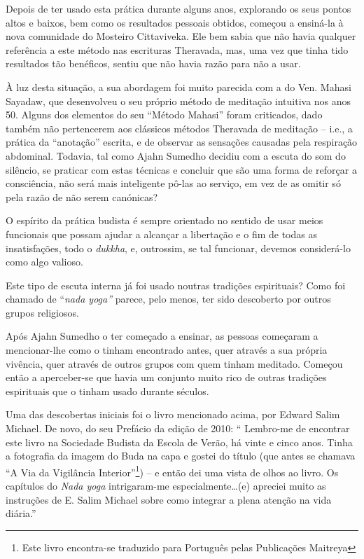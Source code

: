 Depois de ter usado esta prática durante alguns anos, explorando os seus
pontos altos e baixos, bem como os resultados pessoais obtidos, começou
a ensiná-la à nova comunidade do Mosteiro Cittaviveka. Ele bem sabia que
não havia qualquer referência a este método nas escrituras Theravada,
mas, uma vez que tinha tido resultados tão benéficos, sentiu que não
havia razão para não a usar.

À luz desta situação, a sua abordagem foi muito parecida com a do Ven.
Mahasi Sayadaw, que desenvolveu o seu próprio método de meditação
intuitiva nos anos 50. Alguns dos elementos do seu ``Método Mahasi''
foram criticados, dado também não pertencerem aos clássicos métodos
Theravada de meditação -- i.e., a prática da ``anotação'' escrita, e de
observar as sensações causadas pela respiração abdominal. Todavia, tal
como Ajahn Sumedho decidiu com a escuta do som do silêncio, se praticar
com estas técnicas e concluir que são uma forma de reforçar a
consciência, não será mais inteligente pô-las ao serviço, em vez de as
omitir só pela razão de não serem canónicas?

O espírito da prática budista é sempre orientado no sentido de usar
meios funcionais que possam ajudar a alcançar a libertação e o fim de
todas as insatisfações, todo o \emph{dukkha}, e, outrossim, se tal
funcionar, devemos considerá-lo como algo valioso.

\smallskip

 Este tipo de escuta interna já foi usado noutras tradições
espirituais? Como foi chamado de ``\emph{nada yoga''} parece, pelo
menos, ter sido descoberto por outros grupos religiosos.

 Após Ajahn Sumedho o ter começado a ensinar, as pessoas começaram a
mencionar-lhe como o tinham encontrado antes, quer através a sua própria
vivência, quer através de outros grupos com quem tinham meditado.
Começou então a aperceber-se que havia um conjunto muito rico de outras
tradições espirituais que o tinham usado durante séculos.

Uma das descobertas iniciais foi o livro mencionado acima, por Edward Salim
Michael. De novo, do seu Prefácio da edição de 2010: `` Lembro-me de encontrar
este livro na Sociedade Budista da Escola de Verão, há vinte e cinco anos. Tinha
a fotografia da imagem do Buda na capa e gostei do título (que antes se chamava
``A Via da Vigilância Interior''\footnote{Este livro encontra-se traduzido para
  Português pelas Publicações Maitreya}) -- e então dei uma vista de olhos ao
livro. Os capítulos do \emph{Nada yoga} intrigaram-me especialmente\ldots{}(e)
apreciei muito as instruções de E. Salim Michael sobre como integrar a plena
atenção na vida diária.''

